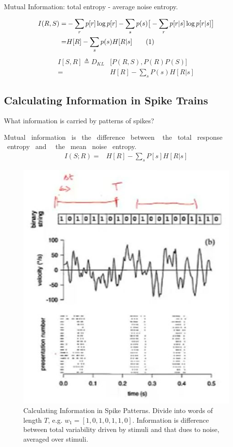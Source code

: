 \documentclass[]{article}
\newcommand\numberthis{\addtocounter{equation}{1}\tag{\theequation}}
\begin{document}
Mutual Information: total entropy - average noise entropy.

\begin{align*}
	I(R,S) =& -\sum_r p[r] \log p[r] - \sum_s p(s)\big[- \sum_r p[r \vert s] \log p[r \vert s]\big]\\
	=& H[R] - \sum_s p(s) H[R\vert s] \numberthis \label{eq:mutual:information}\\
\end{align*}
\begin{align*}
	I[S,R] \triangleq D_{KL}&\big[P(R,S),P(R)P(S)\big]\\
	=&H[R]-\sum_s P(s) H[R\vert s]
\end{align*}

\subsection{Calculating Information in Spike Trains}

What information is carried by patterns of spikes?

Mutual  information  is  the  difference  between  
the  total  response  entropy  and   the  mean  noise  entropy.
\begin{align*}
	I(S;R) =& H[R] - \sum_s P[s] H[R\vert s]
\end{align*}
\begin{figure}[H]
	\begin{center}
			\caption[Calculating Information in Spike Patterns]{Calculating Information in Spike Patterns. Divide into words of length $T$, e.g. $w_1=[1,0,1,0,1,1,0]$. Information is difference between total variability driven by stimuli and that dues to noise, averaged over stimuli.\cite{strong1998entropy}}
		\includegraphics[width=\textwidth]{calculatingInformationInSpikePatterns}
	\end{center}
\end{figure}
\end{document}
